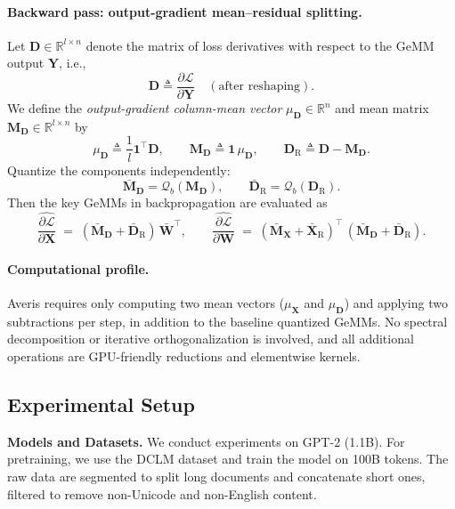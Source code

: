 \paragraph{Backward pass: output-gradient mean--residual splitting.}
Let $\mathbf{D}\in\mathbb{R}^{l\times n}$ denote the matrix of loss derivatives with respect to
the GeMM output $\mathbf{Y}$, i.e.,
\[
\mathbf{D}\triangleq \frac{\partial \mathcal{L}}{\partial \mathbf{Y}}
\quad (\text{after reshaping}).
\]
We define the \emph{output-gradient column-mean vector} $\mu_{\mathbf{D}}\in\mathbb{R}^{n}$ and mean matrix
$\mathbf{M}_{\mathbf{D}}\in\mathbb{R}^{l\times n}$ by
\[
\mu_{\mathbf{D}} \triangleq \frac{1}{l}\mathbf{1}^{\top}\mathbf{D},
\qquad
\mathbf{M}_{\mathbf{D}} \triangleq \mathbf{1}\,\mu_{\mathbf{D}},
\qquad
\mathbf{D}_{\mathrm{R}} \triangleq \mathbf{D}-\mathbf{M}_{\mathbf{D}}.
\]
Quantize the components independently:
\[
\bar{\mathbf{M}}_{\mathbf{D}}=\mathcal{Q}_b(\mathbf{M}_{\mathbf{D}}),
\qquad
\bar{\mathbf{D}}_{\mathrm{R}}=\mathcal{Q}_b(\mathbf{D}_{\mathrm{R}}).
\]
Then the key GeMMs in backpropagation are evaluated as
\begin{equation}
\label{eq:averis_backward}
\widehat{\frac{\partial \mathcal{L}}{\partial \mathbf{X}}}
\;=\;
(\bar{\mathbf{M}}_{\mathbf{D}}+\bar{\mathbf{D}}_{\mathrm{R}})\,\bar{\mathbf{W}}^{\top},
\qquad
\widehat{\frac{\partial \mathcal{L}}{\partial \mathbf{W}}}
\;=\;
(\bar{\mathbf{M}}_{\mathbf{X}}+\bar{\mathbf{X}}_{\mathrm{R}})^{\top}\,(\bar{\mathbf{M}}_{\mathbf{D}}+\bar{\mathbf{D}}_{\mathrm{R}}).
\end{equation}

\paragraph{Computational profile.}
Averis requires only computing two mean vectors ($\mu_{\mathbf{X}}$ and $\mu_{\mathbf{D}}$) and applying
two subtractions per step, in addition to the baseline quantized GeMMs.
No spectral decomposition or iterative orthogonalization is involved, and all additional operations are
GPU-friendly reductions and elementwise kernels.

\subsection{Experimental Setup}

\label{experiment:setup}
\textbf{Models and Datasets.}
We conduct experiments on GPT-2 (1.1B).
For pretraining, we use the DCLM dataset and train the model on 100B tokens.
The raw data are segmented to split long documents and concatenate short ones, filtered to remove non-Unicode and non-English content.

